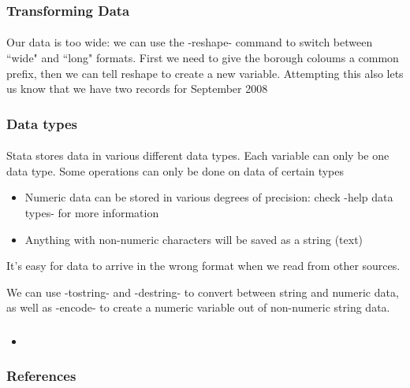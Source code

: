 \documentclass{beamer}
\begin{document}
\begin{frame}
  \frametitle{Transforming Data}
  \framesubtitle{}
Our data is too wide: we can use the -reshape- command to switch between ``wide" and ``long" formats. First we need to give the borough coloums a common prefix, then we can tell reshape to create a new variable. Attempting this also lets us know that we have two records for September 2008




\end{frame}


\begin{frame}
  \frametitle{Data types}
  \framesubtitle{}
Stata stores data in various different data types. Each variable can only be one data type. Some operations can only be done on data of certain types
  \begin{itemize}
    \item Numeric data can be stored in various degrees of precision: check -help data types- for more information
    \item Anything with non-numeric characters will be saved as a string (text)
  \end{itemize}

It's easy for data to arrive in the wrong format when we read from other sources.


We can use -tostring- and -destring- to convert between string and numeric data, as well as -encode- to create a numeric variable out of non-numeric string data.
\end{frame}




\begin{frame}
  \frametitle{}
  \framesubtitle{}
  \begin{itemize}
    \item 
  \end{itemize}
\end{frame}

\begin{frame}
  \frametitle{References}


\end{frame}
\end{document}
